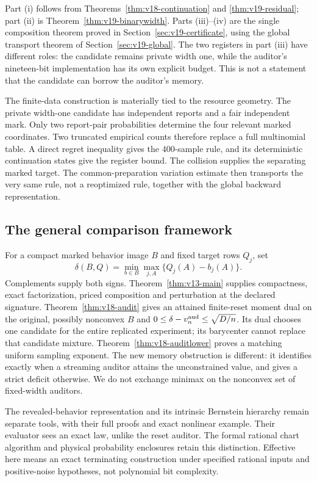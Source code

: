Part (i) follows from Theorems~\ref{thm:v18-continuation} and
\ref{thm:v19-residual}; part (ii) is
Theorem~\ref{thm:v19-binarywidth}. Parts (iii)--(iv) are the single
composition theorem proved in Section~\ref{sec:v19-certificate}, using
the global transport theorem of Section~\ref{sec:v19-global}. The two
registers in part (iii) have different roles: the candidate remains private
width one, while the auditor's nineteen-bit implementation has its own
explicit budget. This is not a statement that the candidate can borrow
the auditor's memory.

The finite-data construction is materially tied to the resource geometry.
The private width-one candidate has independent reports and a fair
independent mark. Only two report-pair probabilities determine the four
relevant marked coordinates. Two truncated empirical counts therefore
replace a full multinomial table. A direct regret inequality gives the
$400$-sample rule, and its deterministic continuation states give the
register bound. The collision supplies the separating marked target. The
common-preparation variation estimate then transports the very same rule,
not a reoptimized rule, together with the global backward representation.

\subsection{The general comparison framework}
For a compact marked behavior image $B$ and fixed target rows $Q_j$, set
\[
 \delta(B,Q)=\min_{b\in B}\max_{j,A}\{Q_j(A)-b_j(A)\}.
\]
Complements supply both signs. Theorem~\ref{thm:v13-main} supplies
compactness, exact factorization, priced composition and perturbation at
the declared signature. Theorem~\ref{thm:v18-audit} gives an attained
finite-reset moment dual on the original, possibly nonconvex $B$ and
$0\le\delta-v^{\rm aud}_n\le\sqrt{D/n}$. Its dual chooses one candidate for
the entire replicated experiment; its barycenter cannot replace that
candidate mixture. Theorem~\ref{thm:v18-auditlower} proves a matching
uniform sampling exponent. The new memory obstruction is different: it
identifies exactly when a streaming auditor attains the unconstrained
value, and gives a strict deficit otherwise. We do not exchange minimax
on the nonconvex set of fixed-width auditors.

The revealed-behavior representation and its intrinsic Bernstein hierarchy
remain separate tools, with their full proofs and exact nonlinear example.
Their evaluator sees an exact law, unlike the reset auditor. The formal
rational chart algorithm and physical probability enclosures retain this
distinction. Effective here means an exact terminating construction under
specified rational inputs and positive-noise hypotheses, not polynomial
bit complexity.

